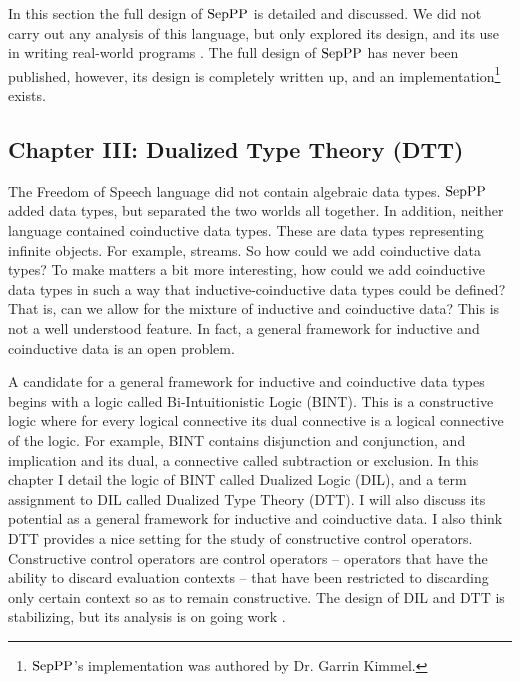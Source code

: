 In this section the full design of $\text{SepPP}$ is detailed and discussed.
We did not carry out any analysis of this language, but only explored
its design, and its use in writing real-world programs
\cite{Kimmel:2013,Kimmel:2012}.  The full design of $\text{SepPP}$ has never
been published, however, its design is completely written up, and
an implementation\footnote{$\text{SepPP}$'s implementation was authored by
  Dr. Garrin Kimmel.}  exists.

\subsection{Chapter III: Dualized Type Theory (DTT)}
\label{subsec:dualized_type_theory}
The Freedom of Speech language did not contain algebraic data types.
$\text{SepPP}$ added data types, but separated the two worlds all together.
In addition, neither language contained coinductive data types.  These
are data types representing infinite objects.  For example, streams.
So how could we add coinductive data types?  To make matters a bit
more interesting, how could we add coinductive data types in such a
way that inductive-coinductive data types could be defined?  That is,
can we allow for the mixture of inductive and coinductive data?  This
is not a well understood feature.  In fact, a general framework for
inductive and coinductive data is an open problem.

A candidate for a general framework for inductive and coinductive data
types begins with a logic called Bi-Intuitionistic Logic (BINT). This
is a constructive logic where for every logical connective its dual
connective is a logical connective of the logic.  For example, BINT
contains disjunction and conjunction, and implication and its dual, a
connective called subtraction or exclusion.  In this chapter I detail
the logic of BINT called Dualized Logic (DIL), and a term assignment
to DIL called Dualized Type Theory (DTT).  I will also discuss its
potential as a general framework for inductive and coinductive data.
I also think DTT provides a nice setting for the study of constructive
control operators. Constructive control operators are control
operators -- operators that have the ability to discard evaluation
contexts -- that have been restricted to discarding only certain
context so as to remain constructive.  The design of DIL and DTT is
stabilizing, but its analysis is on going work \cite{Stump:2013}.

